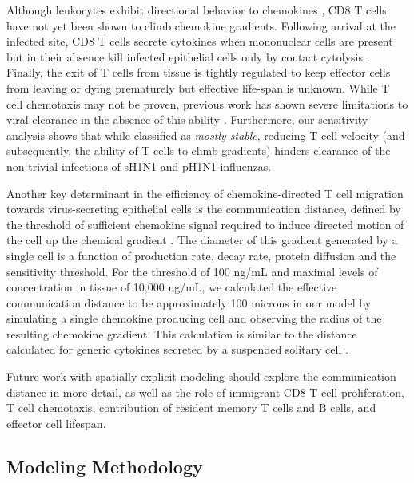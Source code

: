 \documentclass[10pt]{article}
\begin{document}
Although leukocytes exhibit directional behavior to chemokines \cite{LiJeon2002, McDonald2010}, CD8 T cells have not yet been shown to climb chemokine gradients.   Following arrival at the infected site, CD8 T cells secrete cytokines when mononuclear cells are present but in their absence kill infected epithelial cells only by contact cytolysis \cite{Hufford2011}.   Finally, the exit of T cells from tissue is tightly regulated to keep effector cells from leaving or dying prematurely \cite{Jennrich2012, Richter2007} but effective life-span is unknown.  While T cell chemotaxis may not be proven, previous work has shown severe limitations to viral clearance in the absence of this ability \cite{Banerjee2011}.  Furthermore, our sensitivity analysis shows that while classified as \textit{mostly stable}, reducing T cell velocity (and subsequently, the ability of T cells to climb gradients) hinders clearance of the non-trivial infections of sH1N1 and pH1N1 influenzas.   

Another key determinant in the efficiency of chemokine-directed T cell migration towards virus-secreting epithelial cells is the communication distance, defined by the threshold of sufficient chemokine signal required to induce directed motion of the cell up the chemical gradient \cite{Thelen2008}.  The diameter of this gradient generated by a single cell is a function of production rate, decay rate, protein diffusion and the sensitivity threshold.  For the threshold of 100 ng/mL and maximal levels of concentration in tissue of 10,000 ng/mL, we calculated the effective communication distance to be approximately 100 microns in our model by simulating a single chemokine producing cell and observing the radius of the resulting chemokine gradient.  This calculation is similar to the distance calculated for generic cytokines secreted by a suspended solitary cell \cite{Francis1997}.  

Future work with spatially explicit modeling should explore the communication distance in more detail, as well as the role of immigrant CD8 T cell proliferation, T cell chemotaxis, contribution of resident memory T cells and B cells, and effector cell lifespan. 

\subsection*{Modeling Methodology}
\end{document}
